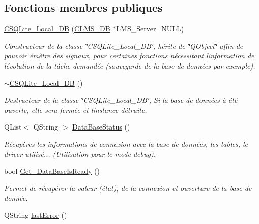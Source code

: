 \subsection*{Fonctions membres publiques}
\begin{DoxyCompactItemize}
\item 
\hyperlink{class_c_s_q_lite___local___d_b_a1de8dfa1437f6ff518b0375017aba25f}{C\+S\+Q\+Lite\+\_\+\+Local\+\_\+\+D\+B} (\hyperlink{class_c_l_m_s___d_b}{C\+L\+M\+S\+\_\+\+D\+B} $\ast$L\+M\+S\+\_\+\+Server=N\+U\+L\+L)
\begin{DoxyCompactList}\small\item\em Constructeur de la classe \char`\"{}\+C\+S\+Q\+Lite\+\_\+\+Local\+\_\+\+D\+B\char`\"{}, hérite de \char`\"{}\+Q\+Object\char`\"{} affin de pouvoir émètre des signaux, pour certaines fonctions nécessitant l\textquotesingle{}information de l\textquotesingle{}évolution de la tâche demandée (sauvegarde de la base de données par exemple). \end{DoxyCompactList}\item 
\hyperlink{class_c_s_q_lite___local___d_b_a69062f8b1874c6f0c98d71184f188be8}{$\sim$\+C\+S\+Q\+Lite\+\_\+\+Local\+\_\+\+D\+B} ()
\begin{DoxyCompactList}\small\item\em Destructeur de la classe \char`\"{}\+C\+S\+Q\+Lite\+\_\+\+Local\+\_\+\+D\+B\char`\"{}, Si la base de données à été ouverte, elle sera fermée et l\textquotesingle{}instance détruite. \end{DoxyCompactList}\item 
Q\+List$<$ Q\+String $>$ \hyperlink{class_c_s_q_lite___local___d_b_a5a593d4e0e70f08ce0537f9a10587072}{Data\+Base\+Status} ()
\begin{DoxyCompactList}\small\item\em Récupères les informations de connexion avec la base de données, les tables, le driver utilisé... (Utilisation pour le mode debug). \end{DoxyCompactList}\item 
bool \hyperlink{class_c_s_q_lite___local___d_b_ad3380dd61189863c1d2d5e681b853e0e}{Get\+\_\+\+Data\+Base\+Is\+Ready} ()
\begin{DoxyCompactList}\small\item\em Permet de récupérer la valeur (état), de la connexion et ouverture de la base de donnée. \end{DoxyCompactList}\item 
Q\+String \hyperlink{class_c_s_q_lite___local___d_b_afac16a908090524ff6ae6958d2a5c399}{last\+Error} ()

\end{DoxyCompactItemize}

